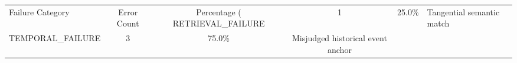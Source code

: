 \begin{tabular}{lccc}
\hline
Failure Category & Error Count & Percentage (%
\hline
RETRIEVAL\_FAILURE & 1 & 25.0\% & Tangential semantic match \\
TEMPORAL\_FAILURE & 3 & 75.0\% & Misjudged historical event anchor \\
\hline
\end{tabular}
